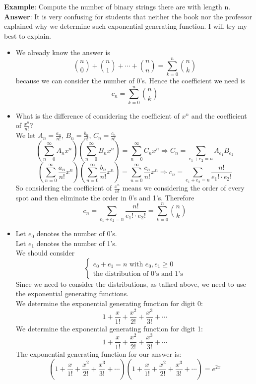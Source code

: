 \noindent \textbf{Example}: Compute the number of binary strings there are with length n.\\
\textbf{Answer}: It is very confusing for students that neither the book nor the professor explained why we determine such exponential generating function. I will try my best to explain.
\begin{itemize}
    \item We already know the answer is $${n \choose 0}+{n \choose 1}+ \cdots +{n \choose n}=\sum_{k=0}^{n}{n \choose k}$$ because we can consider the number of 0's. Hence the coefficient we need is $$c_n=\sum_{k=0}^n {n \choose k}$$
    \item What is the difference of considering the coefficient of $x^n$ and the coefficient of $\frac{x^n}{n!}$?\\
    We let $A_n=\frac{a_n}{n!}$, $B_n=\frac{b_n}{n!}$, $C_n=\frac{c_n}{n!}$
    $$(\sum_{n=0}^{\infty}A_nx^n)(\sum_{n=0}^{\infty}B_nx^n)=\sum_{n=0}^{\infty}C_nx^n \Longrightarrow C_n=\sum_{e_1+e_2=n}A_{e_1}B_{e_2}$$
    $$(\sum_{n=0}^{\infty}\frac{a_n}{n!}x^n)(\sum_{n=0}^{\infty}\frac{b_n}{n!}x^n)=\sum_{n=0}^{\infty}\frac{c_n}{n!}x^n \Longrightarrow c_n=\sum_{e_1+e_2=n}\frac{n!}{e_1! \cdot e_2!}$$
    So considering the coefficient of $\frac{x^n}{n!}$ means we considering the order of every spot and then eliminate the order in 0's and 1's.
    Therefore $$c_n=\sum_{e_1+e_2=n}\frac{n!}{e_1! \cdot e_2!}=\sum_{k=0}^{n}{n \choose k}$$
    \item Let $e_0$ denotes the number of 0's.\\
    Let $e_1$ denotes the number of 1's.\\
    We should consider 
    \begin{equation}
        \begin{cases}
            e_0+e_1=n \text{ with } e_0,e_1 \geq 0\\
            \text{the distribution of 0's and 1's}
        \end{cases}
    \end{equation}
    Since we need to consider the distributions, as talked above, we need to use the exponential generating functions.\\
    We determine the exponential generating function for digit 0:
    $$1+\frac{x}{1!}+\frac{x^2}{2!}+\frac{x^3}{3!}+ \cdots$$
    We determine the exponential generating function for digit 1:
    $$1+\frac{x}{1!}+\frac{x^2}{2!}+\frac{x^3}{3!}+ \cdots$$
    The exponential generating function for our answer is:
    $$(1+\frac{x}{1!}+\frac{x^2}{2!}+\frac{x^3}{3!}+ \cdots)(1+\frac{x}{1!}+\frac{x^2}{2!}+\frac{x^3}{3!}+ \cdots)=e^{2x}$$
\end{itemize}

